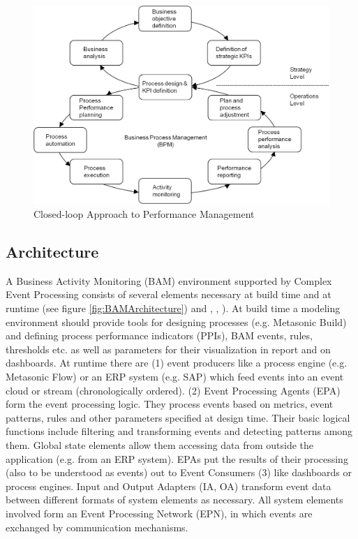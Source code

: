 \begin{figure}[htbp]
	\centering
	\includegraphics[width=0.8\linewidth]{Figures/Chapter5/Monitoring/Approach-Performance-Mgmt.jpg}
	\caption[Closed-loop Approach to Performance Management]{Closed-loop Approach to Performance Management \cite{book:AnalytInfSys}}
	\label{fig:Approach-Performance}
\end{figure}



\subsection{Architecture }  
A Business Activity Monitoring (BAM) environment supported by Complex Event Processing consists of several elements necessary at build time and at runtime (see figure \ref{fig:BAMArchitecture}) and \cite{book:processmonitoring}, \cite{book:CEPinAction} , \cite{article:BlueprintEventBPM}). At build time a modeling environment should provide tools for designing processes (e.g. Metasonic Build) and defining process performance indicators (PPIs), BAM events, rules, thresholds etc. as well as parameters for their visualization in report and on dashboards. At runtime there are (1) event producers like a process engine (e.g. Metasonic Flow) or an ERP system (e.g. SAP) which feed events into an event cloud or stream (chronologically ordered). (2) Event Processing Agents (EPA) form the event processing logic. They process events based on metrics, event patterns, rules and other parameters specified at design time. Their basic logical functions include filtering and transforming events and detecting patterns among them. Global state elements allow them accessing data from outside the application (e.g. from an ERP system). EPAs put the results of their processing (also to be understood as events) out to Event Consumers (3) like dashboards or process engines. Input and Output Adapters (IA, OA) transform event data between different formats of system elements as necessary. All system elements involved form an Event Processing Network (EPN), in which events are exchanged by communication mechanisms.

